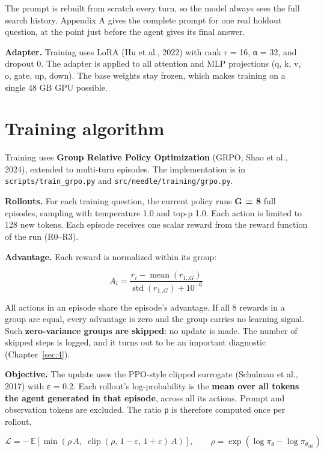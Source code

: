 The prompt is rebuilt from scratch every turn, so the model always sees
the full search history. Appendix A gives the complete prompt for one
real holdout question, at the point just before the agent gives its
final answer.

\textbf{Adapter.} Training uses LoRA (Hu et al., 2022) with rank r = 16,
α = 32, and dropout 0. The adapter is applied to all attention and MLP
projections (q, k, v, o, gate, up, down). The base weights stay frozen,
which makes training on a single 48 GB GPU possible.

\section{Training algorithm}\label{sec:3.6}

Training uses \textbf{Group Relative Policy Optimization} (GRPO; Shao et
al., 2024), extended to multi-turn episodes. The implementation is in
\texttt{scripts/\allowbreak{}train\_\allowbreak{}grpo.\allowbreak{}py}
and
\texttt{src/\allowbreak{}needle/\allowbreak{}training/\allowbreak{}grpo.\allowbreak{}py}.

\textbf{Rollouts.} For each training question, the current policy runs
\textbf{G = 8} full episodes, sampling with temperature 1.0 and top-p
1.0. Each action is limited to 128 new tokens. Each episode receives one
scalar reward from the reward function of the run (R0--R3).

\textbf{Advantage.} Each reward is normalized within its group:

\[
A_i = \frac{r_i - \operatorname{mean}(r_{1..G})}{\operatorname{std}(r_{1..G}) + 10^{-6}}
\]

All actions in an episode share the episode's advantage. If all 8
rewards in a group are equal, every advantage is zero and the group
carries no learning signal. Such \textbf{zero-variance groups are
skipped}: no update is made. The number of skipped steps is logged, and
it turns out to be an important diagnostic (Chapter~\ref{sec:4}).

\textbf{Objective.} The update uses the PPO-style clipped surrogate
(Schulman et al., 2017) with ε = 0.2. Each rollout's log-probability is
the \textbf{mean over all tokens the agent generated in that episode},
across all its actions. Prompt and observation tokens are excluded. The
ratio ρ is therefore computed once per rollout.

\[
\mathcal{L} = -\,\mathbb{E}\left[\min\left(\rho\,A,\; \operatorname{clip}(\rho,\,1-\varepsilon,\,1+\varepsilon)\,A\right)\right],
\qquad \rho = \exp\left(\log\pi_\theta - \log\pi_{\theta_\text{old}}\right)
\]

